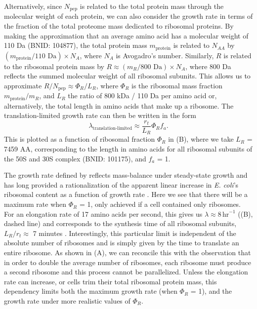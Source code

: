 Alternatively, since $N_\text{pep}$ is related to the total protein mass through
the molecular weight of each protein, we can also consider the growth rate in
terms of the fraction of the total proteome mass dedicated to ribosomal
proteins. By making the approximation that an average amino acid has a molecular
weight of 110 Da (BNID: 104877), the total protein mass $m_{\textrm{protein}}$
is related to $N_{AA}$ by $(m_{\textrm{protein}}/\text{110 Da}) \times N_A$,
where $N_A$ is Avogadro's number. Similarly, $R$ is related to the ribosomal
protein mass by $R \approx (m_R/\text{800 Da}) \times N_A$, where 800 Da
reflects the summed molecular weight of all ribosomal subunits.  This allows us
to approximate  $R / N_\text{pep} \approx \Phi_R / L_R$,  where $\Phi_R$ is the
ribosomal mass fraction $m_{\textrm{protein}}/m_R$, and $L_R$ the ratio of 800
kDa / 110 Da per amino acid or, alternatively, the total length in amino acids
that make up a ribosome. The translation-limited growth rate can then be written
in the form
\begin{equation}
\lambda_{\textrm{translation-limited}} \approx \frac{r_t}{L_R}  \Phi_R f_a.
\label{eq:translation_limit_growth_rate}
\end{equation}
This is plotted as a function of ribosomal fraction $\Phi_R$ in
(B), where we take $L_R$ = 7459 AA, corresponding to the
length in amino acids for all ribosomal subunits of the 50S and 30S complex
(BNID: 101175), and $f_a$ = 1.

The growth rate defined by  reflects
mass-balance under steady-state growth and has long provided a rationalization
of the apparent linear increase in \textit{E. coli}'s ribosomal content as a
function of growth rate \citep{goldberger1979, scott2010}. Here we see that
there will be a maximum rate when $\Phi_R$ = 1, only achieved if a cell
contained only ribosomes. For an elongation rate of 17 amino acids per second,
this gives us $\lambda \approx 8 \,\text{hr}^{-1}$ ((B),
dashed line) and corresponds to the synthesis time of all ribosomal subunits,
$L_R/ r_t \approx$ 7 minutes \citep{dill2011}. Interestingly, this particular
limit is independent of the absolute number of ribosomes and is simply given by
the time to translate an entire ribosome. As shown in (A),
we can reconcile this with the observation that in order to double the average
number of ribosomes, each ribosome must produce a second ribosome and this
process cannot be parallelized. Unless the elongation rate can increase, or
cells trim their total ribosomal protein mass, this dependency limits both the
maximum growth rate (when $\Phi_R$ = 1), and the growth rate under more
realistic values of $\Phi_R$.

